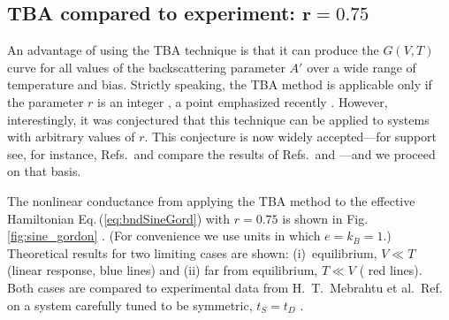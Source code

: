 \documentclass[aps,prb,reprint,floatfix,superscriptaddress,amssymb,amsmath]{revtex4-2}
\begin{document}
\subsection{TBA compared to experiment: $\mathbf{ r\!=\!0.75}$}

An advantage of using the TBA technique is that it can produce the $G(V,T)$ curve for all values of the backscattering parameter $A'$ over a wide range of temperature and bias.
Strictly speaking, the TBA method is applicable only if the parameter $r$ is an integer \cite{FendleyPRB95}, a point emphasized recently \cite{boulatX2019}.
However, interestingly, it was conjectured \cite{FendleySaleur96} that this technique can be applied to systems with arbitrary values of $r$.
This conjecture is now widely accepted---for support see, for instance, Refs.\,\cite{BaurWeissPRB04,ClerkBackactionPRL06,KomnikWeissAnnPhys07} 
and compare the results of Refs.\,\cite{FendleyPRB95} and \cite{AristovWoelfle09}---and we proceed on that basis. 

The nonlinear conductance from applying the TBA method to the effective Hamiltonian Eq.\,(\ref{eq:bndSineGord}) with $r\!=\!0.75$ is shown in Fig.\,\ref{fig:sine_gordon} \cite{FendleyMethod}. 
(For convenience we use units in which $e\!=\!k_B\!=\!1$.)
Theoretical results for two limiting cases are shown: 
(i)~equilibrium, $V \!\ll\! T$ (linear response, blue lines) and (ii) far from equilibrium, $T\!\ll\! V$ (%
red lines). 
Both cases are compared to experimental data from H.\ T.\ Mebrahtu et al.\ Ref.\,\cite{Mebrahtu13}  
on a system carefully tuned to be symmetric, $t_S \!=\! t_D$ \cite{GlebData}.
\end{document}
